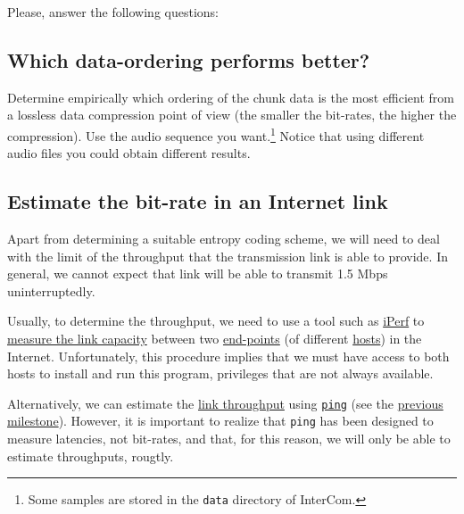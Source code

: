 Please, answer the following questions:

\subsection{Which data-ordering performs better?}
Determine empirically which ordering of the chunk data is the most
efficient from a lossless data compression point of view (the smaller
the bit-rates, the higher the compression). Use the audio sequence you
want.\footnote{Some samples are stored in the \texttt{data} directory of
  InterCom.} Notice that using different audio files you could obtain
different results.

\subsection{Estimate the bit-rate in an Internet link}
Apart from determining a suitable entropy coding scheme, we will need
to deal with the limit of the throughput that the transmission link is
able to provide. In general, we cannot expect that link will be able
to transmit 1.5 Mbps uninterruptedly.

Usually, to determine the throughput, we need to use a tool such as
\href{https://iperf.fr/}{iPerf} to
\href{https://en.wikipedia.org/wiki/Measuring_network_throughput}{measure
  the link capacity} between two
\href{https://datatracker.ietf.org/doc/html/rfc4113}{end-points} (of
different \href{https://en.wikipedia.org/wiki/Host_(network)}{hosts})
in the Internet. Unfortunately, this procedure implies that we must
have access to both hosts to install and run this program, privileges
that are not always available.

Alternatively, we can estimate the
\href{https://en.wikipedia.org/wiki/Throughput}{link throughput} using
\href{https://github.com/torvalds/linux/blob/master/net/ipv4/ping.c}{\texttt{ping}}
(see the
\href{https://tecnologias-multimedia.github.io/contents/latency/}{previous
  milestone}). However, it is important to realize that
\texttt{ping} has been designed to measure latencies, not bit-rates,
and that, for this reason, we will only be able to estimate
throughputs, rougtly.

